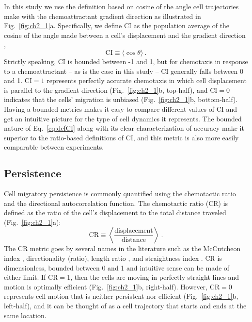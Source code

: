 In this study we use the definition based on cosine of the angle cell trajectories make with the chemoattractant gradient direction as illustrated in Fig.\ \ref{fig:ch2_1}a. Specifically, we define CI as the population average of the cosine of the angle made between a cell's displacement and the gradient direction \cite{mouneimne2006spatial,kay2008changing,funamoto2001role},
\begin{equation} \label{eq:defCI}
    \text{CI} \equiv \langle \cos \theta \rangle \ .
\end{equation}
Strictly speaking, CI is bounded between -1 and 1, but for chemotaxis in response to a chemoattractant -- as is the case in this study -- CI generally falls between 0 and 1. $\text{CI} = 1$ represents perfectly accurate chemotaxis in which cell displacement is parallel to the gradient direction (Fig.\ \ref{fig:ch2_1}b, top-half), and $\text{CI} = 0$ indicates that the cells' migration is unbiased (Fig.\ \ref{fig:ch2_1}b, bottom-half). Having a bounded metrics makes it easy to compare different values of CI and get an intuitive picture for the type of cell dynamics it represents. The bounded nature of Eq.\ \ref{eq:defCI} along with its clear characterization of accuracy make it superior to the ratio-based definitions of CI, and this metric is also more easily comparable between experiments.

\subsection{Persistence}

Cell migratory persistence is commonly quantified using the chemotactic ratio and the directional autocorrelation function. The chemotactic ratio (CR) is defined as the ratio of the cell's displacement to the total distance traveled (Fig.\ \ref{fig:ch2_1}a):
\begin{equation} \label{eq:defCR}
    \text{CR} \equiv  \left\langle \frac{\text{displacement}}{\text{distance}} \right\rangle \ .
\end{equation}
The CR metric goes by several names in the literature such as the McCutcheon index \cite{mccutcheon1946chemotaxis}, directionality (ratio), length ratio \cite{gorelik2014quantitative}, and straightness index \cite{codling2008random}.
CR is dimensionless, bounded between 0 and 1 and intuitive sense can be made of either limit. If $\text{CR} = 1$, then the cells are moving in perfectly straight lines and motion is optimally efficient (Fig.\ \ref{fig:ch2_1}b, right-half). However, $\text{CR} = 0$ represents cell motion that is neither persistent nor efficient (Fig.\ \ref{fig:ch2_1}b, left-half), and it can be thought of as a cell trajectory that starts and ends at the same location.

